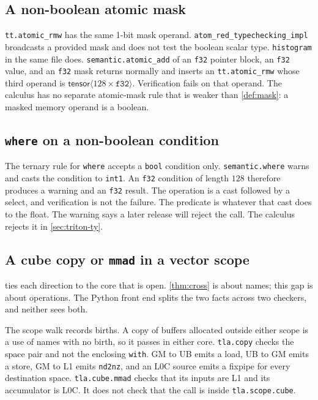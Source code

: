 \documentclass[a4paper,UKenglish,anonymous,cleveref,autoref]{lipics-v2021}
\begin{document}
\subsection{A non-boolean atomic mask}

\texttt{tt.atomic\_rmw} has the same 1-bit mask operand.
\texttt{atom\_red\_typechecking\_impl} broadcasts a provided mask and does not test the boolean scalar type.
\texttt{histogram} in the same file does.
\texttt{semantic.atomic\_add} of an \texttt{f32} pointer block, an \texttt{f32} value, and an \texttt{f32} mask returns normally and inserts an \texttt{tt.atomic\_rmw} whose third operand is \(\mathsf{tensor}\langle 128\times\texttt{f32}\rangle\).
Verification fails on that operand.
The calculus has no separate atomic-mask rule that is weaker than \cref{def:mask}: a masked memory operand is a boolean.

\subsection{\texttt{where} on a non-boolean condition}

The ternary rule for \texttt{where} accepts a \texttt{bool} condition only.
\texttt{semantic.where} warns and casts the condition to \texttt{int1}.
An \texttt{f32} condition of length \(128\) therefore produces a warning and an \texttt{f32} result.
The operation is a cast followed by a select, and verification is not the failure.
The predicate is whatever that cast does to the float.
The warning says a later release will reject the call.
The calculus rejects it in \cref{sec:triton-ty}.

\subsection{A cube copy or \texttt{mmad} in a vector scope}

 ties each direction to the core that is open.
\cref{thm:cross} is about names; this gap is about operations.
The Python front end splits the two facts across two checkers, and neither sees both.

The scope walk records births.
A copy of buffers allocated outside either scope is a use of names with no birth, so it passes in either core.
\texttt{tla.copy} checks the space pair and not the enclosing \texttt{with}.
GM to UB emits a load, UB to GM emits a store, GM to L1 emits \texttt{nd2nz}, and an L0C source emits a fixpipe for every destination space.
\texttt{tla.cube.mmad} checks that its inputs are L1 and its accumulator is L0C.
It does not check that the call is inside \texttt{tla.scope.cube}.
\end{document}
